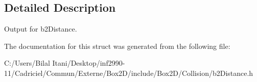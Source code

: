 \subsection{Detailed Description}
Output for b2\+Distance. 

The documentation for this struct was generated from the following file\+:\begin{DoxyCompactItemize}
\item 
C\+:/\+Users/\+Bilal Itani/\+Desktop/inf2990-\/11/\+Cadriciel/\+Commun/\+Externe/\+Box2\+D/include/\+Box2\+D/\+Collision/b2\+Distance.\+h\end{DoxyCompactItemize}
